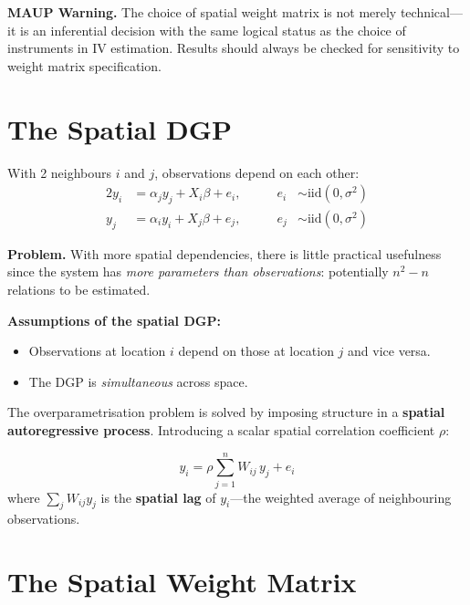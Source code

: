 \begin{tcolorbox}[definition]
\textbf{MAUP Warning.} The choice of spatial weight matrix is not merely
technical---it is an inferential decision with the same logical status as the
choice of instruments in IV estimation. Results should always be checked for
sensitivity to weight matrix specification.
\end{tcolorbox}


\section{The Spatial DGP}
\label{sec_SpatialDGP}

With 2 neighbours $i$ and $j$, observations depend on each other:
\begin{alignat*}{2}
  y_i &= \alpha_j y_j + X_i\beta + e_i, \qquad &e_i &\sim \text{iid}(0,\sigma^2) \\
  y_j &= \alpha_i y_i + X_j\beta + e_j, \qquad &e_j &\sim \text{iid}(0,\sigma^2)
\end{alignat*}

\noindent\textbf{Problem.} With more spatial dependencies, there is little
practical usefulness since the system has \emph{more parameters than
observations}: potentially $n^2 - n$ relations to be estimated.

\noindent\textbf{Assumptions of the spatial DGP:}
\begin{itemize}
  \item Observations at location $i$ depend on those at location $j$ and
    vice versa.
  \item The DGP is \emph{simultaneous} across space.
\end{itemize}

The overparametrisation problem is solved by imposing structure in a
\textbf{spatial autoregressive process}.
Introducing a scalar spatial correlation coefficient $\rho$:

\begin{tcolorbox}[keyresult]
\begin{equation}
  y_i = \rho\sum_{j=1}^{n} W_{ij}\,y_j + e_i
\end{equation}
where $\sum_j W_{ij}y_j$ is the \textbf{spatial lag} of
$y_i$---the weighted average of neighbouring observations.
\end{tcolorbox}


\section{The Spatial Weight Matrix}
\label{sec_WeightMatrix}

